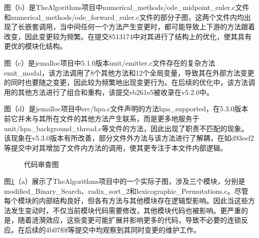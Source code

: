 图（b）是TheAlgorithms项目中numerical\_methods/ode\_midpoint\_euler.c文件和numerical\_methods/ode\_forward\_euler.c文件的部分子图，这两个文件内均出现了长嵌套调用，当中间任何一个方法产生变更时，都可能导致上下游的方法跟着改变，因此变更较为频繁。在提交8513174中对其进行了结构上的优化，使其具有更优的模块化结构。

图（c）是jemalloc项目中5.1.0版本unit/emitter.c文件存在的复杂方法emit\_modal，该方法调用了8个其他方法和12个全局变量，导致其在外部方法变更的同时也要随之变更，因此较为频繁地出现变更行为。在后续的优化中，该方法调用的其他方法进行了组合和重构，该提交eb261e5被收录在v5.2.0中。

图（d）是jemalloc项目中src/hpa.c文件声明的方法hpa\_supported，在5.3.0版本前它并未与其所在文件的其他方法产生联系，而是更多地服务于unit/hpa\_background\_thread.c等文件的方法，因此出现了职责不匹配的现象。该现象在v5.3.0版本有所改善，部分文件外方法与该方法进行了解耦，在如d93eef2等提交中对其增加了文件内方法的调用，使其更专注于本文件内部逻辑。

\begin{figure}[!h]
    \setlength{\subfigcapskip}{-1bp}
    \centering
    \begin{minipage}{\textwidth}
    \centering
    \hspace{2em}
    \end{minipage}
    \vspace{0.2em}
    \caption{代码审查图} %
    \label{1_不良的逻辑型变更影响实例}
\end{figure}

图\ref{1_不良的逻辑型变更影响实例}（a）展示了TheAlgorithms项目中的一个实际子图，涉及三个模块，分别是modified\_Binary\_Search、radix\_sort\_2和lexicographic\_Permutations.c。尽管每个模块的内部结构良好，但各有方法与其他模块存在逻辑型影响。因此当这些方法发生变动时，不仅当前模块代码需要修改，其他模块代码也被影响。更严重的是，随着涟漪效应，这些变更可能扩展并影响更多的代码，导致不必要的连锁反应。在后续的4b07f0f等提交中均观察到其同时变更的维护工作。

